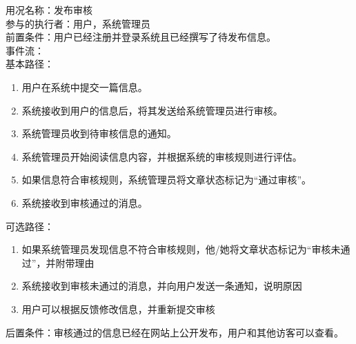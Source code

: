 \begin{framed}
\noindent
用况名称：发布审核\\
参与的执行者：用户，系统管理员\\
前置条件：用户已经注册并登录系统且已经撰写了待发布信息。\\
事件流：\\
基本路径：
\begin{enumerate}[itemsep=2pt,topsep=0pt,parsep=0pt,itemindent=1em]
    \item 用户在系统中提交一篇信息。
    \item 系统接收到用户的信息后，将其发送给系统管理员进行审核。
    \item 系统管理员收到待审核信息的通知。
    \item 系统管理员开始阅读信息内容，并根据系统的审核规则进行评估。
    \item 如果信息符合审核规则，系统管理员将文章状态标记为“通过审核”。
    \item 系统接收到审核通过的消息。
    \end{enumerate}
\noindent
可选路径：\par
   \begin{enumerate}[itemsep=2pt,topsep=0pt,parsep=0pt,itemindent=1em]  
       \item 如果系统管理员发现信息不符合审核规则，他/她将文章状态标记为“审核未通过”，并附带理由
       \item 系统接收到审核未通过的消息，并向用户发送一条通知，说明原因
       \item 用户可以根据反馈修改信息，并重新提交审核  
   \end{enumerate} 
后置条件：审核通过的信息已经在网站上公开发布，用户和其他访客可以查看。
\end{framed}

